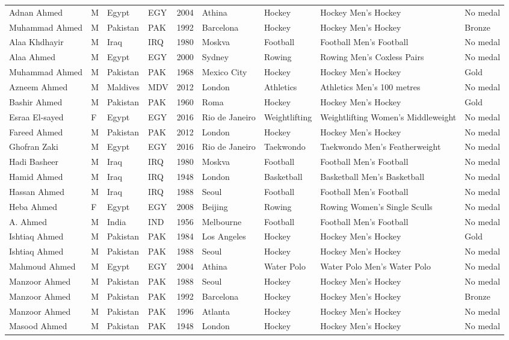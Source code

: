 \documentclass{article}%
\begin{document}
\begin{longtable}{p{1.5cm} p{0.5cm} p{2cm} p{1cm} p{1cm} p{1.5cm} p{1.5cm} p{5cm} p{1.5cm}}
Adnan Ahmed&M&Egypt&EGY&2004&Athina&Hockey&Hockey Men's Hockey&No medal\\%
Muhammad Ahmed&M&Pakistan&PAK&1992&Barcelona&Hockey&Hockey Men's Hockey&Bronze\\%
Alaa Khdhayir&M&Iraq&IRQ&1980&Moskva&Football&Football Men's Football&No medal\\%
Alaa Ahmed&M&Egypt&EGY&2000&Sydney&Rowing&Rowing Men's Coxless Pairs&No medal\\%
Muhammad Ahmed&M&Pakistan&PAK&1968&Mexico City&Hockey&Hockey Men's Hockey&Gold\\%
Azneem Ahmed&M&Maldives&MDV&2012&London&Athletics&Athletics Men's 100 metres&No medal\\%
Bashir Ahmed&M&Pakistan&PAK&1960&Roma&Hockey&Hockey Men's Hockey&Gold\\%
Esraa El{-}sayed&F&Egypt&EGY&2016&Rio de Janeiro&Weightlifting&Weightlifting Women's Middleweight&No medal\\%
Fareed Ahmed&M&Pakistan&PAK&2012&London&Hockey&Hockey Men's Hockey&No medal\\%
Ghofran Zaki&M&Egypt&EGY&2016&Rio de Janeiro&Taekwondo&Taekwondo Men's Featherweight&No medal\\%
Hadi Basheer&M&Iraq&IRQ&1980&Moskva&Football&Football Men's Football&No medal\\%
Hamid Ahmed&M&Iraq&IRQ&1948&London&Basketball&Basketball Men's Basketball&No medal\\%
Hassan Ahmed&M&Iraq&IRQ&1988&Seoul&Football&Football Men's Football&No medal\\%
Heba Ahmed&F&Egypt&EGY&2008&Beijing&Rowing&Rowing Women's Single Sculls&No medal\\%
A. Ahmed&M&India&IND&1956&Melbourne&Football&Football Men's Football&No medal\\%
Ishtiaq Ahmed&M&Pakistan&PAK&1984&Los Angeles&Hockey&Hockey Men's Hockey&Gold\\%
Ishtiaq Ahmed&M&Pakistan&PAK&1988&Seoul&Hockey&Hockey Men's Hockey&No medal\\%
Mahmoud Ahmed&M&Egypt&EGY&2004&Athina&Water Polo&Water Polo Men's Water Polo&No medal\\%
Manzoor Ahmed&M&Pakistan&PAK&1988&Seoul&Hockey&Hockey Men's Hockey&No medal\\%
Manzoor Ahmed&M&Pakistan&PAK&1992&Barcelona&Hockey&Hockey Men's Hockey&Bronze\\%
Manzoor Ahmed&M&Pakistan&PAK&1996&Atlanta&Hockey&Hockey Men's Hockey&No medal\\%
Masood Ahmed&M&Pakistan&PAK&1948&London&Hockey&Hockey Men's Hockey&No medal\\%

\end{longtable}
\end{document}
